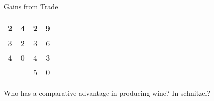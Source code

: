 \documentclass{beamer}
\begin{document}
\begin{frame}{Gains from Trade}
\begin{table}[]
\begin{tabular}{|c|c|c|c|}
    2                                                         & 4                                                             & 2                                                         & 9                                                             \\ \hline
    3                                                         & 2                                                             & 3                                                         & 6                                                             \\ \hline
    4                                                         & 0                                                             & 4                                                         & 3                                                             \\ \hline
                                                              &                                                               & 5                                                         & 0                                                             \\ \hline
    \end{tabular}
    \end{table}
    Who has a comparative advantage in producing wine? In schnitzel?
\end{frame}
\end{document}
